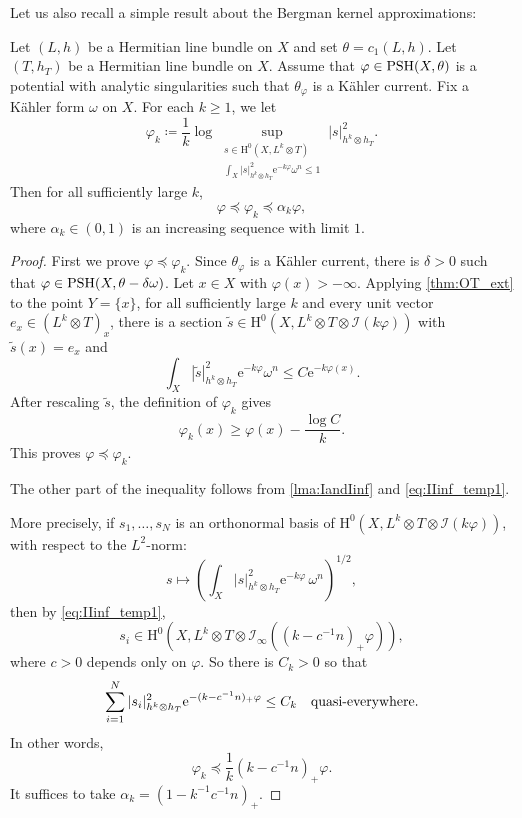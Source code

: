 Let us also recall a simple result about the Bergman kernel approximations:
\begin{proposition}\label{prop:Bergman_approx}
Let $(L,h)$ be a Hermitian line bundle on $X$ and set $\theta=c_1(L,h)$. Let $(T,h_T)$ be a Hermitian line bundle on $X$. Assume that $\varphi\in \mathrm{PSH}(X,\theta)$ is a potential with analytic singularities such that $\theta_{\varphi}$ is a K\"ahler current. Fix a K\"ahler form $\omega$ on $X$.
For each $k\geq 1$, we let
\begin{equation}\label{eq:Bergman_seq_def}
\varphi_k \coloneqq \frac{1}{k} \log \sup_{\substack{s \in \mathrm{H}^0(X,L^k \otimes T)\\ \int_X |s|^2_{h^k  \otimes h_T}\mathrm{e}^{-k\varphi} \omega^n \leq 1}} |s|^2_{h^k  \otimes h_T}.
\end{equation}
Then for all sufficiently large $k$,
\[
\varphi\preceq \varphi_k\preceq \alpha_k \varphi,
\]
where $\alpha_k\in (0,1)$ is an increasing sequence with limit $1$.
\end{proposition}
\begin{proof}

First we prove $\varphi\preceq \varphi_k$. Since $\theta_{\varphi}$ is a K\"ahler current, there is $\delta>0$ such that $\varphi\in \mathrm{PSH}(X,\theta-\delta\omega)$. Let $x\in X$ with $\varphi(x)>-\infty$. Applying \cref{thm:OT_ext} to the point $Y=\{x\}$, for all sufficiently large $k$ and every unit vector $e_x\in (L^k\otimes T)_x$, there is a section $\tilde{s}\in \mathrm{H}^0(X,L^k\otimes T\otimes \mathcal{I}(k\varphi))$ with $\tilde{s}(x)=e_x$ and
\[
    \int_X |\tilde{s}|^2_{h^k\otimes h_T}\mathrm{e}^{-k\varphi}\omega^n\leq C\mathrm{e}^{-k\varphi(x)}.
\]
After rescaling $\tilde{s}$, the definition of $\varphi_k$ gives
\[
    \varphi_k(x)\geq \varphi(x)-\frac{\log C}{k}.
\]
This proves $\varphi\preceq\varphi_k$.

The other part of the inequality follows from \cref{lma:IandIinf} and \eqref{eq:IIinf_temp1}.

More precisely, if $s_1,\ldots,s_N$ is an orthonormal basis of $\mathrm{H}^0(X,L^k\otimes T\otimes \mathcal{I}(k\varphi))$, with respect to the $L^2$-norm:
\[
s\mapsto \left( \int_X |s|^2_{h^k\otimes h_T}\mathrm{e}^{-k\varphi}\,\omega^n \right)^{1/2},
\]
then by \eqref{eq:IIinf_temp1},
\[
s_i\in \mathrm{H}^0\left(X,L^k\otimes T\otimes \mathcal{I}_{\infty}\left((k-c^{-1}n)_+\varphi\right)\right),
\]
where $c>0$ depends only on $\varphi$. So there is $C_k>0$ so that
\[
\sum_{i=1}^N |s_i|^2_{h^k\otimes h_T}\mathrm{e}^{-(k-c^{-1}n)_+\varphi}\leq C_k\quad \textup{quasi-everywhere}.
\]
In other words,
\[
\varphi_k\preceq \frac{1}{k}\left( k-c^{-1}n \right)_+ \varphi.
\]
It suffices to take $\alpha_k=(1-k^{-1}c^{-1}n)_+$.
\end{proof}
